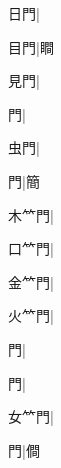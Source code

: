 \begin{multicols}{2}
{{\cjk{}{\cnsym{}　}日門}\mktsJzrVerticalBar{}{\cjk{}{\cnsym{}　}{\cnsym{}　}{\cnsym{}　}}|{}\par
{\cjk{}{\cnsym{}　}目門}\mktsJzrVerticalBar{}{\cjk{}{\cnsym{}　}{\cnsym{}　}{\cnsym{}　}}|{\cjk{}瞷}\par
{\cjk{}{\cnsym{}　}見門}\mktsJzrVerticalBar{}{\cjk{}{\cnsym{}　}{\cnsym{}　}{\cnsym{}　}}|{}\par
{門}\mktsJzrVerticalBar{}{\cjk{}{\cnsym{}　}{\cnsym{}　}{\cnsym{}　}}|{}\par
{\cjk{}{\cnsym{}　}虫門}\mktsJzrVerticalBar{}{\cjk{}{\cnsym{}　}{\cnsym{}　}{\cnsym{}　}}|{}\par
{門}\mktsJzrVerticalBar{}{\cjk{}{\cnsym{}　}{\cnsym{}　}{\cnsym{}　}}|{\cjk{}簡}\par
{\cjk{}木{\cnxb{}𥫗}門}\mktsJzrVerticalBar{}{\cjk{}{\cnsym{}　}{\cnsym{}　}{\cnsym{}　}}|{}\par
{\cjk{}口{\cnxb{}𥫗}門}\mktsJzrVerticalBar{}{\cjk{}{\cnsym{}　}{\cnsym{}　}{\cnsym{}　}}|{}\par
{\cjk{}金{\cnxb{}𥫗}門}\mktsJzrVerticalBar{}{\cjk{}{\cnsym{}　}{\cnsym{}　}{\cnsym{}　}}|{}\par
{\cjk{}火{\cnxb{}𥫗}門}\mktsJzrVerticalBar{}{\cjk{}{\cnsym{}　}{\cnsym{}　}{\cnsym{}　}}|{}\par
{門}\mktsJzrVerticalBar{}{\cjk{}{\cnsym{}　}{\cnsym{}　}{\cnsym{}　}}|{}\par
{門}\mktsJzrVerticalBar{}{\cjk{}{\cnsym{}　}{\cnsym{}　}{\cnsym{}　}}|{}\par
{\cjk{}女{\cnxb{}𥫗}門}\mktsJzrVerticalBar{}{\cjk{}{\cnsym{}　}{\cnsym{}　}{\cnsym{}　}}|{}\par
{門}\mktsJzrVerticalBar{}{\cjk{}{\cnsym{}　}{\cnsym{}　}{\cnsym{}　}}|{\cjk{}僴}\par
}
\end{multicols}
